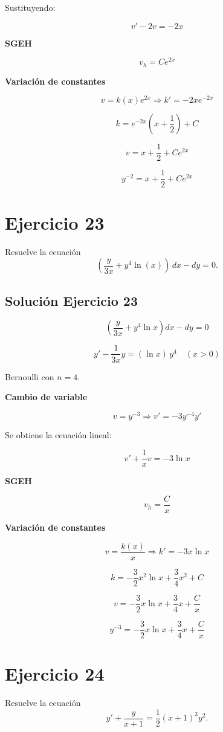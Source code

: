 \documentclass[12pt]{article}
\begin{document}
Sustituyendo:

\[
v' - 2v = -2x
\]

\textbf{SGEH}

\[
v_h = C e^{2x}
\]

\textbf{Variación de constantes}

\[
v = k(x)e^{2x}
\Rightarrow
k' = -2x e^{-2x}
\]

\[
k = e^{-2x}\left(x+\frac{1}{2}\right) + C
\]

\[
v = x + \frac{1}{2} + C e^{2x}
\]

\[
\boxed{y^{-2} = x + \frac{1}{2} + C e^{2x}}
\]

\section*{Ejercicio 23}
Resuelve la ecuación
\[
\left(\dfrac{y}{3x} + y^4 \ln(x)\right)\,dx - dy = 0.
\]

\subsection*{Solución Ejercicio 23}

\[
\left(\frac{y}{3x} + y^4 \ln x\right) dx - dy = 0
\]

\[
y' - \frac{1}{3x}y = (\ln x)\,y^4
\quad (x>0)
\]

Bernoulli con \(n=4\).

\textbf{Cambio de variable}

\[
v = y^{-3}
\Rightarrow
v' = -3y^{-4}y'
\]

Se obtiene la ecuación lineal:

\[
v' + \frac{1}{x}v = -3\ln x
\]

\textbf{SGEH}

\[
v_h = \frac{C}{x}
\]

\textbf{Variación de constantes}

\[
v = \frac{k(x)}{x}
\Rightarrow
k' = -3x\ln x
\]

\[
k = -\frac{3}{2}x^2\ln x + \frac{3}{4}x^2 + C
\]

\[
v = -\frac{3}{2}x\ln x + \frac{3}{4}x + \frac{C}{x}
\]

\[
\boxed{y^{-3} = -\frac{3}{2}x\ln x + \frac{3}{4}x + \frac{C}{x}}
\]

\section*{Ejercicio 24}
Resuelve la ecuación
\[
y' + \dfrac{y}{x + 1} = \dfrac{1}{2}(x + 1)^3 y^2.
\]
\end{document}
